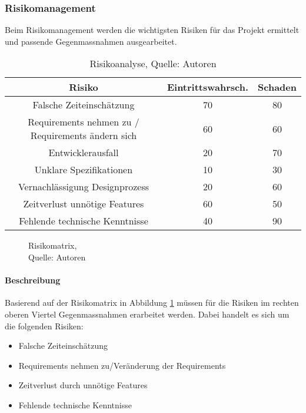 \subsubsection{Risikomanagement}
Beim Risikomanagement werden die wichtigsten Risiken für das Projekt ermittelt und passende Gegenmassnahmen ausgearbeitet. 

\begin{table}[H]
\setlength\extrarowheight{2pt} %
\begin{tabularx}{\textwidth}{|C|C|C|}
\hline
\textbf{Risiko} & \textbf{Eintrittswahrsch.} & \textbf{Schaden} \\

\hline
Falsche Zeiteinschätzung &  70 & 80\\
\hline
Requirements nehmen zu / Requirements ändern sich & 60 & 60\\
\hline
Entwicklerausfall & 20 & 70\\
\hline
Unklare Spezifikationen & 10 & 30\\
\hline
Vernachlässigung Designprozess & 20 & 60\\
\hline
Zeitverlust unnötige Features & 60 & 50\\
\hline
Fehlende technische Kenntnisse & 40 & 90\\
\hline
\end{tabularx}
\caption{ \label{tbl: Risikoanalyse}Risikoanalyse, Quelle: Autoren}
\end{table}

\begin{figure}[H]
    \centering
    \caption[Risikomatrix]{Risikomatrix,\\ Quelle: Autoren}
    \label{img: Risikomatrix}
\end{figure}

\paragraph{Beschreibung}
Basierend auf der Risikomatrix in Abbildung \ref{img: Risikomatrix} müssen für die Risiken im rechten oberen Viertel Gegenmassnahmen erarbeitet werden. Dabei handelt es sich um die folgenden Risiken:
\begin{itemize}
\item Falsche Zeiteinschätzung
\item Requirements nehmen zu/Veränderung der Requirements
\item Zeitverlust durch unnötige Features
\item Fehlende technische Kenntnisse
\end{itemize}


